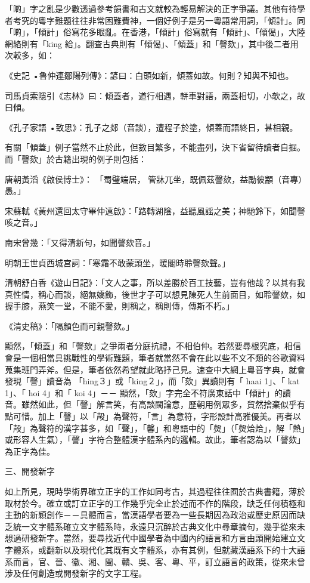 「啲」字之亂是少數透過參考韻書和古文就較為輕易解決的正字爭議。其他有待學者考究的粵字難題往往非常困難費神，一個好例子是另一粵語常用詞，「傾計」。同「啲」，「傾計」俗寫花多眼亂。在香港，「傾計」俗寫就有「傾計」、「傾偈」，大陸網絡則有「king 給」。翻查古典則有「傾偈」、「傾蓋」和「謦欬」，其中後二者用次較多，如：

《史記 •魯仲連鄒陽列傳》：諺曰：白頭如新，傾蓋如故。何則？知與不知也。

司馬貞索隱引《志林》曰：傾蓋者，道行相遇，軿車對語，兩蓋相切，小欹之，故曰傾。

《孔子家語 •致思》：孔子之郯（音談），遭程子於塗，傾蓋而語終日，甚相親。

有關「傾蓋」例子當然不止於此，但數目繁多，不能盡列，決下省留待讀者自掘。而「謦欬」於古籍出現的例子則包括：

唐朝黃滔《啟侯博士》： 「蜀璧端居， 管牀兀坐，既佩茲謦欬，益勵彼顓（音專）愚。」

宋蘇軾《黃州還回太守畢仲遠啟》：「路轉湖陰，益聽風謡之美；神馳鈴下，如聞謦咳之音。」

南宋曾幾：「又得清新句，如聞謦欬音。」

明朝王世貞西城宫詞：「寒霜不敢蒙頭坐，暖閣時聆謦欬聲。」

清朝舒白香《遊山日記》：「文人之事，所以差勝於百工技藝，豈有他哉？以其有我真性情，稱心而談，絕無嬌飾，後世才子可以想見陳死人生前面目，如聆謦欬，如握手膝，燕笑一堂，不能不愛，則稱之，稱則傳，傳斯不朽。」

《清史稿》：「隔顏色而可親謦欬。」

顯然，「傾蓋」和「謦欬」之爭兩者分庭抗禮，不相伯仲。若然要尋根究底，相信會是一個相當具挑戰性的學術難題，筆者就當然不會在此以些不文不類的谷歌資料蒐集班門弄斧。但是，筆者依然希望就此略抒己見。速查中大網上粵音字典，就會發現「謦」讀音為 「hing３」或「king２」，而「欬」異讀則有「 haai 1」、「 kat 1」、「 hoi 4」和「 koi 4」－－ 顯然，「欬」字完全不符廣東話中「傾計」的讀音。雖然如此，但「謦」解言笑，有高談闊論意，歷朝用例眾多，貿然捨棄似乎有點可惜。加上「謦」以「殸」為聲符，「言」為意符，字形設計高雅優美。再者以「殸」為聲符的漢字甚多，如「聲」，「馨」和粵語中的「㷫」（「㷫烚烚」，解「熱」或形容人生氣），「謦」字符合整體漢字體系內的邏輯。故此，筆者認為以「謦欬」為正字為佳。

三、開發新字

如上所見，現時學術界確立正字的工作如同考古，其過程往往囿於古典書籍，薄於取材於今。確立或訂立正字的工作幾乎完全止於述而不作的階段，缺乏任何積極和主動的新穎創作－－具體而言，當漢語學者要為一些長期因為政治或歷史原因而缺乏統一文字體系確立文字體系時，永遠只沉醉於古典文化中尋章摘句，幾乎從來未想過研發新字。當然，要尋找近代中國學者為中國內的語言和方言由頭開始建立文字體系，或翻新以及現代化其既有文字體系，亦有其例，但就藏漢語系下的十大語系而言，官、晉、徽、湘、閩、贛、吳、客、粵、平，訂立語言的政策，從來未曾涉及任何創造或開發新字的文字工程。

